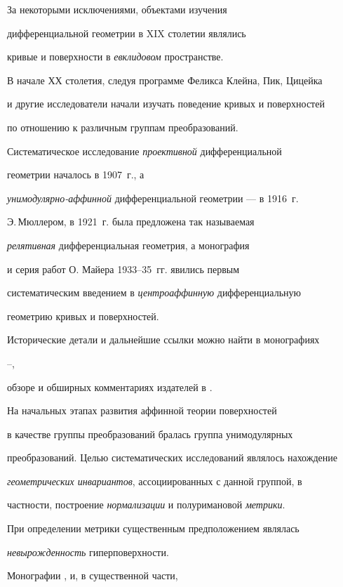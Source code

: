 За некоторыми исключениями, объектами изучения


дифференциальной геометрии в XIX столетии являлись


кривые и поверхности в {\it евклидовом} пространстве.


В начале ХХ столетия, следуя программе Феликса Клейна, Пик, Цицейка


и другие исследователи начали изучать поведение кривых и поверхностей


по отношению к различным группам преобразований.


Систематическое исследование {\it проективной} дифференциальной


геометрии началось в 1907~г., а


{\it унимодулярно-аффинной} дифференциальной геометрии --- в 1916~г.


Э.\,Мюллером, в 1921~г. была предложена так называемая


{\it релятивная} дифференциальная геометрия, а монография


\cite{SALK} и серия работ О. Майера 1933--35~гг. явились первым


систематическим введением в {\it центроаффинную} дифференциальную


геометрию кривых и поверхностей.


Исторические детали и дальнейшие ссылки можно найти в монографиях


\cite{SCHI}--\cite{LI-S-Z-1},




обзоре \cite{SIM-5} и обширных комментариях издателей в \cite{BLA-1}.





На начальных этапах развития аффинной теории поверхностей


в качестве группы преобразований бралась группа унимодулярных


преобразований. Целью систематических исследований являлось нахождение


{\it геометрических инвариантов}, ассоциированных с данной группой, в


частности, построение {\it нормализации} и полуримановой {\it метрики}.


При определении метрики существенным предположением являлась


{\it невырожденность} гиперповерхности.


Монографии \cite{BLA}, \cite{SALK} и, в существенной части, \cite{SCHI}



